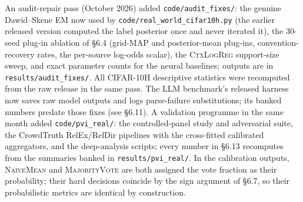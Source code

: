 {An audit-repair pass (October 2026) added \texttt{code/audit\_fixes/}:
the genuine Dawid--Skene EM now used by
\texttt{code/real\_world\_cifar10h.py} (the earlier released version
computed the label posterior once and never iterated it), the 30-seed
plug-in ablation of \S6.4 (grid-MAP and posterior-mean plug-ins,
convention-recovery rates, the per-source log-odds scalar), the
\textsc{CtxLogReg} support-size sweep, and exact parameter counts for
the neural baselines; outputs are in \texttt{results/audit\_fixes/}.
All CIFAR-10H descriptive statistics were recomputed from the raw
release in the same pass. The LLM benchmark's released harness now
saves raw model outputs and logs parse-failure substitutions; its
banked numbers predate those fixes (see \S6.11). A validation
programme in the same month added \texttt{code/pvi\_real/}: the
controlled-panel study and adversarial suite, the CrowdTruth
RelEx/RelDir pipelines with the cross-fitted calibrated aggregators,
and the deep-analysis scripts; every number in \S6.13 recomputes
from the summaries banked in \texttt{results/pvi\_real/}. In the calibration
outputs, \textsc{NaiveMean} and \textsc{MajorityVote} are both
assigned the vote fraction as their probability; their hard decisions
coincide by the sign argument of \S6.7, so their probabilistic
metrics are identical by construction.
\par}
